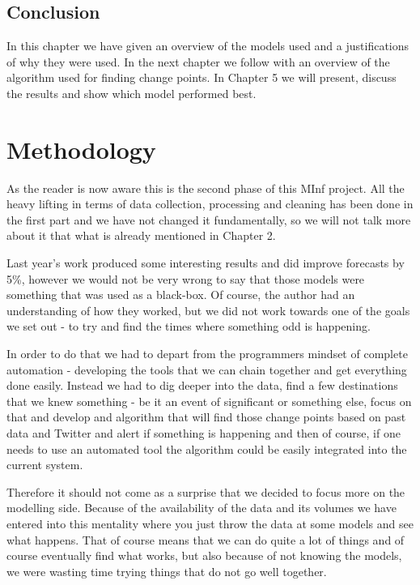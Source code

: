 \documentclass[minf,twoside,singlespacing,parskip,notimes,deptreport]{infthesis} %
\begin{document}
\section{Conclusion}

In this chapter we have given an overview of the models used and a justifications of why they were used. 
In the next chapter we follow with an overview of the algorithm used for finding change points.        
In Chapter 5 we will present, discuss the results and show which model performed best.

\chapter{Methodology}


As the reader is now aware this is the second phase of this MInf project. All the heavy lifting in terms of data collection, processing and cleaning has been done in the first part and we have not changed it fundamentally, so we will not talk more about it that what is already mentioned in Chapter 2. 

Last year's work produced some interesting results and did improve forecasts by 5\%, however we would not be very wrong to say that those models were something that was used as a black-box. Of course, the author had an understanding of how they worked, but we did not work towards one of the goals we set out - to try and find the times where something odd is happening.

In order to do that we had to depart from the programmers mindset of complete automation - developing the tools that we can chain together and get everything done easily. Instead we had to dig deeper into the data, find a few destinations that we knew something - be it an event of significant or something else, focus on that and develop and algorithm that will find those change points based on past data and Twitter and alert if something is happening and then of course, if one needs to use an automated tool the algorithm could be easily integrated into the current system.

Therefore it should not come as a surprise that we decided to focus more on the modelling side. Because of the availability of the data and its volumes we have entered into this mentality where you just throw the data at some models and see what happens. That of course means that we can do quite a lot of things and of course eventually find what works, but also because of not knowing the models, we were wasting time trying things that do not go well together. 
\end{document}

